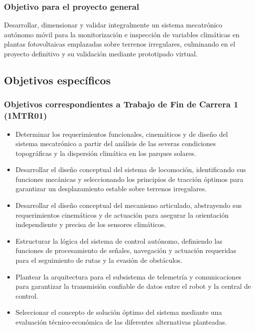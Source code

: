 \documentclass[../../General.tex]{subfiles}
\begin{document}
\subsubsection{Objetivo para el proyecto general}
Desarrollar, dimensionar y validar integralmente un sistema mecatrónico autónomo móvil para la monitorización e inspección de variables climáticas en plantas fotovoltaicas emplazadas sobre terrenos irregulares, culminando en el proyecto definitivo y su validación mediante prototipado virtual.

\subsection{Objetivos específicos}

\subsubsection{Objetivos correspondientes a Trabajo de Fin de Carrera 1 (1MTR01)}
\begin{itemize}
    \item Determinar los requerimientos funcionales, cinemáticos y de diseño del sistema mecatrónico a partir del análisis de las severas condiciones topográficas y la dispersión climática en los parques solares.
    \item Desarrollar el diseño conceptual del sistema de locomoción, identificando sus funciones mecánicas y seleccionando los principios de tracción óptimos para garantizar un desplazamiento estable sobre terrenos irregulares.
    \item Desarrollar el diseño conceptual del mecanismo articulado, abstrayendo sus requerimientos cinemáticos y de actuación para asegurar la orientación independiente y precisa de los sensores climáticos.
    \item Estructurar la lógica del sistema de control autónomo, definiendo las funciones de procesamiento de señales, navegación y actuación requeridas para el seguimiento de rutas y la evasión de obstáculos.
    \item Plantear la arquitectura para el subsistema de telemetría y comunicaciones para garantizar la transmisión confiable de datos entre el robot y la central de control.
    \item Seleccionar el concepto de solución óptimo del sistema mediante una evaluación técnico-económica de las diferentes alternativas planteadas.
\end{itemize}
\end{document}
